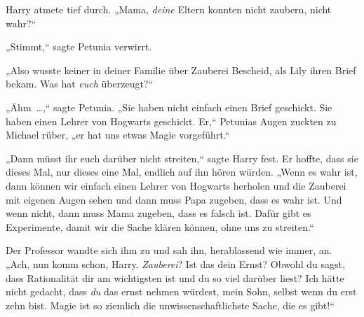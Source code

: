 Harry atmete tief durch. „Mama, \emph{deine} Eltern konnten nicht zaubern, nicht wahr?“

„Stimmt,“ sagte Petunia verwirrt.

„Also wusste keiner in deiner Familie über Zauberei Bescheid, als Lily ihren Brief bekam. Was hat \emph{euch} überzeugt?“

„Ähm …,“ sagte Petunia. „Sie haben nicht einfach einen Brief geschickt. Sie haben einen Lehrer von Hogwarts geschickt. Er,“ Petunias Augen zuckten zu Michael rüber, „er hat uns etwas Magie vorgeführt.“

„Dann müsst ihr euch darüber nicht streiten,“ sagte Harry fest. Er hoffte, dass sie dieses Mal, nur dieses eine Mal, endlich auf ihn hören würden. „Wenn es wahr ist, dann können wir einfach einen Lehrer von Hogwarts herholen und die Zauberei mit eigenen Augen sehen und dann muss Papa zugeben, dass es wahr ist. Und wenn nicht, dann muss Mama zugeben, dass es falsch ist. Dafür gibt es Experimente, damit wir die Sache klären können, ohne uns zu streiten.“

Der Professor wandte sich ihm zu und sah ihn, herablassend wie immer, an. „Ach, nun komm schon, Harry. \emph{Zauberei}? Ist das dein Ernst? Obwohl du sagst, dass Rationalität dir am wichtigsten ist und du so viel darüber liest? Ich hätte nicht gedacht, dass \emph{du} das ernst nehmen würdest, mein Sohn, selbst wenn du erst zehn bist. Magie ist so ziemlich die unwissenschaftlichste Sache, die es gibt!“

